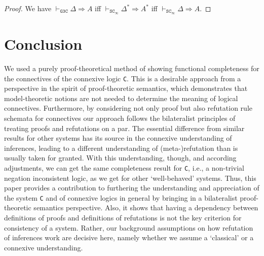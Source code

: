 \documentclass{article}%
\theoremstyle{break}
\begin{document}
\begin{proof}
    We have $\vdash_{\texttt{G3C}} \Delta \Rightarrow A$ iff $\vdash_{\texttt{SC}_\infty} \Delta^* \Rightarrow A^*$ iff $\vdash_{\texttt{SC}_\infty} \Delta \Rightarrow A.$
\end{proof}

\section{Conclusion}
We used a purely proof-theoretical method of showing functional completeness for the connectives of the connexive logic \texttt{C}. 
This is a desirable approach from a perspective in the spirit of proof-theoretic semantics, which demonstrates that model-theoretic notions are not needed to determine the meaning of logical connectives. 
Furthermore, by considering not only proof but also refutation rule schemata for connectives our approach follows the bilateralist principles of treating proofs and refutations on a par.
The essential difference from similar results for other systems has its source in the connexive understanding of inferences, leading to a different understanding of (meta-)refutation than is usually taken for granted.
With this understanding, though, and according adjustments, we can get the same completeness result for \texttt{C}, i.e., a non-trivial negation inconsistent logic, as we get for other `well-behaved' systems.
Thus, this paper provides a contribution to furthering the understanding and appreciation of the system \texttt{C} and of connexive logics in general by bringing in a bilateralist proof-theoretic semantics perspective.
Also, it shows that having a dependency between definitions of proofs and definitions of refutations is not the key criterion for consistency of a system.
Rather, our background assumptions on how refutation of inferences work are decisive here, namely whether we assume a `classical' or a connexive understanding.
\end{document}
